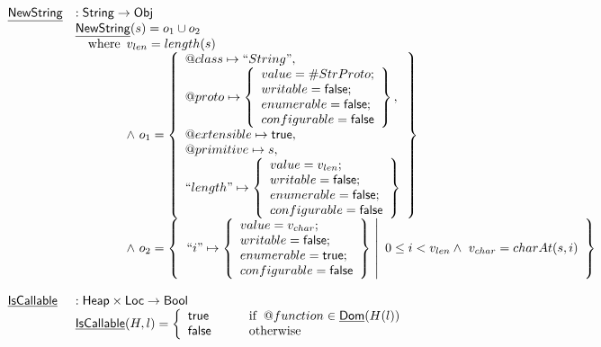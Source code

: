 \documentclass{article}
\makeatletter
\newcommand{\SF}[1]{\mbox{\textsf{#1}}}
\newcommand{\wherec}[1]{{\rm where}\begin{array}[t]{l}#1\end{array}}
\newcommand{\ifc}[1]{{\rm if}\begin{array}[t]{l}#1\end{array}}
\newcommand{\owc}{{\rm otherwise}}
\newcommand{\Heap}{\SF{Heap}}
\newcommand{\Loc}{\SF{Loc}}
\newcommand{\Obj}{\SF{Obj}}
\newcommand{\set}[1]{\left\{\begin{array}{l}#1\end{array}\right\}}
\newcommand{\hf}[1]{\underline{\sf #1}}
\newcommand{\varloc}[1]{\##1}
\newcommand{\varprop}[1]{@#1}
\newcommand{\vtrue}{\SF{true}}
\newcommand{\vfalse}{\SF{false}}
\makeatother
\begin{document}
\[\begin{array}{ll}
\hf{NewString} & : \SF{String} \rightarrow \Obj \\
& \hf{NewString}(s) = o_1 \cup o_2 \\
& \quad\wherec{
  v_{len} = length(s)\\
  \land\ o_1 = \set{
    \varprop{class}\mapsto ``String",\\
    \varprop{proto}\mapsto 
    \set{
      value=\varloc{StrProto};\\writable=\vfalse;\\
      enumerable=\vfalse;\\configurable=\vfalse
    },\\
    \varprop{extensible}\mapsto \vtrue, \\
    \varprop{primitive}\mapsto s, \\
    ``length"\mapsto \set{
      value=v_{len};\\writable=\vfalse;\\
      enumerable=\vfalse;\\configurable=\vfalse
    }
  }\\
  \land\ o_2 = \set{\left.``i"\mapsto \set{
      value = v_{char};\\writable=\vfalse;\\
      enumerable=\vtrue;\\configurable=\vfalse
    } ~\right|~ 0 \leq i < v_{len}\land\ v_{char}=charAt(s,i)}
}\\\\

\hf{IsCallable} & : \Heap \times \Loc \rightarrow \SF{Bool} \\
& \hf{IsCallable}(H,l)
  = \left\{
    \begin{array}{l@{\quad\quad\quad}l}
      \vtrue &\ifc{\varprop{function}\in\hf{Dom}(H(l))}\\
      \vfalse &\owc
    \end{array}
    \right.\\\\
\end{array}
\]
\end{document}
